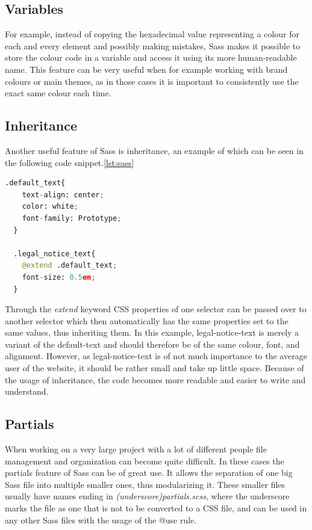 \subsection{Variables}
For example, instead of copying the hexadecimal value representing a colour for each and every element and possibly making mistakes, Sass makes it possible
to store the colour code in a variable and access it using its more human-readable name. This feature can be very useful when for example working with brand
colours or main themes, as in those cases it is important to consistently use the exact same colour each time. \cite{SassFeatures}

\subsection{Inheritance}
Another useful feature of Sass is inheritance, an example of which can be seen in the following code snippet.\ref{lst:sass}

\begin{lstlisting}[language=Python,caption=Textstyling in Sass,label=lst:sass]
  .default_text{
    text-align: center;
    color: white;
    font-family: Prototype;
  }

  .legal_notice_text{
    @extend .default_text;
    font-size: 0.5em;
  }
\end{lstlisting}

Through the \emph{extend} keyword CSS properties of one selector can be passed over to another selector which then automatically has the 
same properties set to the same values, thus inheriting them. In this example, legal-notice-text is merely a variant of the 
default-text and should therefore be of the same colour, font, and alignment. However, as legal-notice-text is of not much 
importance to the average user of the website, it should be rather small and take up little space. Because of the usage of 
inheritance, the code becomes more readable and easier to write and understand. \cite{SassFeatures}

\subsection{Partials}
When working on a very large project with a lot of different people file management and organization can become quite difficult. In
these cases the partials feature of Sass can be of great use. It allows the separation of one big Sass file into multiple smaller ones,
thus modularizing it. These smaller files usually have names ending in \emph{(underscore)partials.scss}, where the underscore marks the file as one
that is not to be converted to a CSS file, and can be used in any other Sass files with the usage of the @use rule. \cite{SassFeatures}

